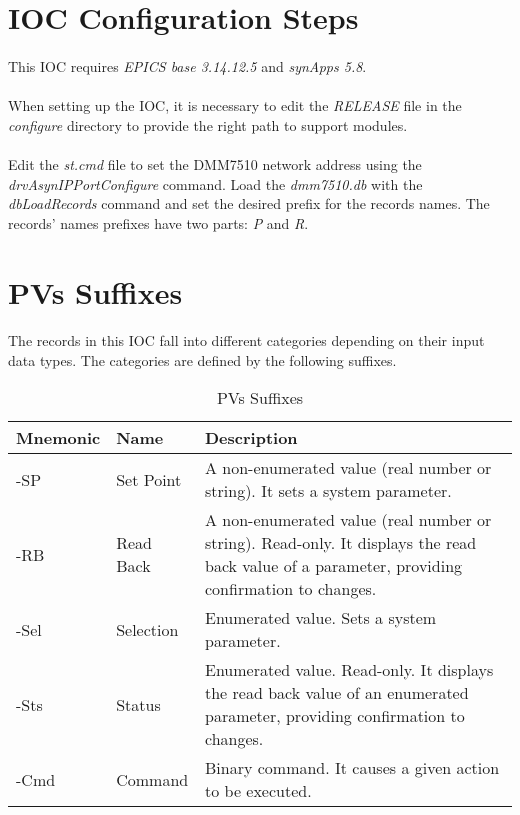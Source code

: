 \documentclass[openany]{article}
\begin{document}
\section{IOC Configuration Steps}

	\paragraph{} This IOC requires \emph{EPICS base 3.14.12.5} and \emph{synApps 5.8}.

	\paragraph{} When setting up the IOC, it is necessary to edit the \emph{RELEASE} file in the \emph{configure} directory to provide the right path to support modules.

	\paragraph{} Edit the \emph{st.cmd} file to set the DMM7510 network address using the \emph{drvAsynIPPortConfigure} command. Load the \emph{dmm7510.db} with the \emph{dbLoadRecords} command and set the desired prefix for the records names. The records' names prefixes have two parts: \emph{P} and \emph{R}.

\section{PVs Suffixes}

	\paragraph{} The records in this IOC fall into different categories depending on their input data types. The categories are defined by the following suffixes.

	\begin{table}[!h]
		\center
		\caption{PVs Suffixes}
		\begin{tabular}{m{3cm} m{3cm} m{7cm}}
			\hline
			\bfseries Mnemonic & \bfseries Name & \bfseries Description \\ \hline
			-SP & Set Point & A non-enumerated value (real number or string). It sets a system parameter. \\ \hline
			-RB & Read Back & A non-enumerated value (real number or string). Read-only. It displays the read back value of a parameter, providing confirmation to changes. \\ \hline
			-Sel & Selection & Enumerated value. Sets a system parameter. \\ \hline
			-Sts & Status & Enumerated value. Read-only. It displays the read back value of an enumerated parameter, providing confirmation to changes. \\ \hline
			-Cmd & Command & Binary command. It causes a given action to be executed. \\ \hline
		\end{tabular}
	\end{table}
\end{document}
